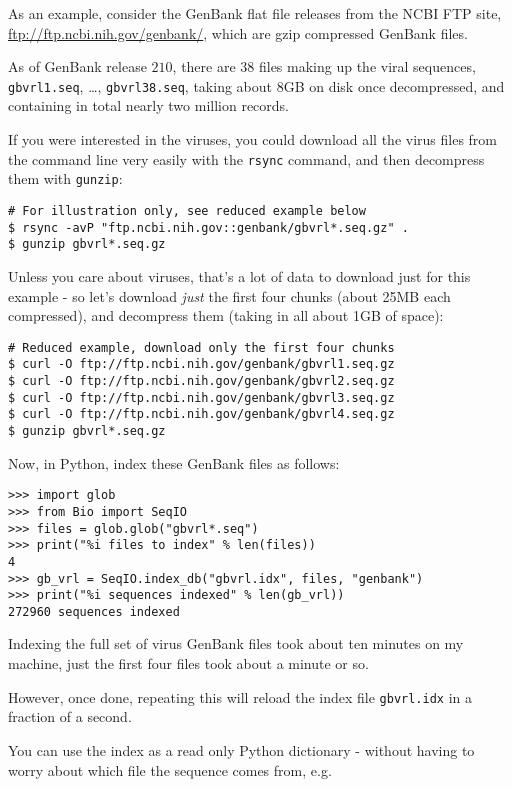 As an example, consider the GenBank flat file releases from the NCBI FTP site,
\url{ftp://ftp.ncbi.nih.gov/genbank/}, which are gzip compressed GenBank files.

As of GenBank release $210$, there are $38$ files making up the viral sequences,
\texttt{gbvrl1.seq}, \ldots, \texttt{gbvrl38.seq}, taking about 8GB on disk once
decompressed, and containing in total nearly two million records.

If you were interested in the viruses, you could download all the virus files
from the command line very easily with the \texttt{rsync} command, and then
decompress them with \texttt{gunzip}:

\begin{verbatim}
# For illustration only, see reduced example below
$ rsync -avP "ftp.ncbi.nih.gov::genbank/gbvrl*.seq.gz" .
$ gunzip gbvrl*.seq.gz
\end{verbatim}

Unless you care about viruses, that's a lot of data to download just for this
example - so let's download \emph{just} the first four chunks (about 25MB each
compressed), and decompress them (taking in all about 1GB of space):

\begin{verbatim}
# Reduced example, download only the first four chunks
$ curl -O ftp://ftp.ncbi.nih.gov/genbank/gbvrl1.seq.gz
$ curl -O ftp://ftp.ncbi.nih.gov/genbank/gbvrl2.seq.gz
$ curl -O ftp://ftp.ncbi.nih.gov/genbank/gbvrl3.seq.gz
$ curl -O ftp://ftp.ncbi.nih.gov/genbank/gbvrl4.seq.gz
$ gunzip gbvrl*.seq.gz
\end{verbatim}

Now, in Python, index these GenBank files as follows:

\begin{verbatim}
>>> import glob
>>> from Bio import SeqIO
>>> files = glob.glob("gbvrl*.seq")
>>> print("%i files to index" % len(files))
4
>>> gb_vrl = SeqIO.index_db("gbvrl.idx", files, "genbank")
>>> print("%i sequences indexed" % len(gb_vrl))
272960 sequences indexed
\end{verbatim}

Indexing the full set of virus GenBank files took about ten minutes on my machine,
just the first four files took about a minute or so.

However, once done, repeating this will reload the index file \verb|gbvrl.idx|
in a fraction of a second.

You can use the index as a read only Python dictionary - without having to worry
about which file the sequence comes from, e.g.

